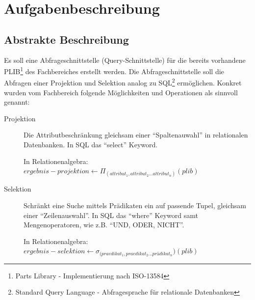 \chapter{Aufgabenbeschreibung} \label{kap:aufgabenbeschreibung}

\section{Abstrakte Beschreibung}


Es soll eine Abfrageschnittstelle (Query-Schnittstelle) für die bereits vorhandene PLIB\footnote{Parts Library - Implementierung nach ISO-13584}  des Fachbereiches erstellt werden. Die Abfrageschnittstelle soll die Abfragen einer Projektion und Selektion analog zu SQL\footnote{Standard Query Language - Abfragesprache für relationale Datenbanken} ermöglichen. 
Konkret wurden vom Fachbereich folgende Möglichkeiten und Operationen als sinnvoll genannt:
\begin{description}
\item[Projektion] Die Attributbeschränkung gleichsam einer \enquote{Spaltenauwahl} in relationalen Datenbanken. In SQL das \enquote{select} Keyword.   

In Relationenalgebra:
$ergebnis-projektion \leftarrow  \Pi_{(attribut_1, attribut_2... attribut_n)}(plib)$ \\

\item[Selektion] Schränkt eine Suche mittels Prädikaten ein auf passende Tupel, gleichsam einer \enquote{Zeilenauswahl}. In SQL das \enquote{where} Keyword samt Mengenoperatoren, wie z.B. \enquote{UND, ODER, NICHT}.

In Relationenalgebra:
$ergebnis-selektion \leftarrow  \sigma_{(praedikat_1, praedikat_2... prädikat_n})(plib)$ \\

\end{description}
 
